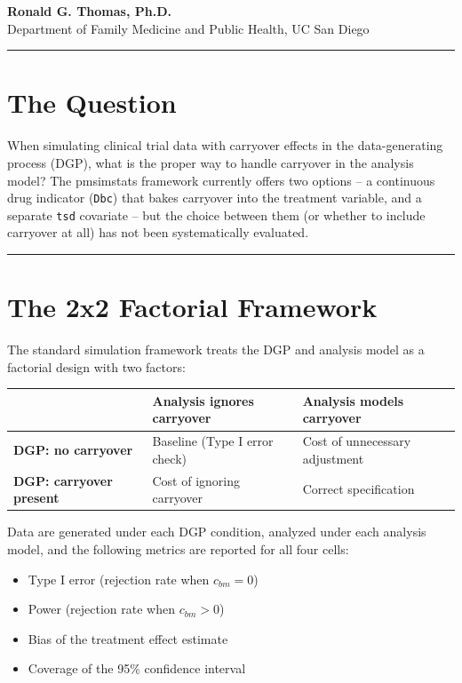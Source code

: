 \documentclass[11pt]{article}
\begin{document}
\maketitle
\thispagestyle{fancy}
\tableofcontents

\textbf{Ronald G. Thomas, Ph.D.}\\
Department of Family Medicine and Public Health, UC San Diego

\bigskip\noindent\rule{\textwidth}{0.4pt}\bigskip

\section{The Question}

When simulating clinical trial data with carryover effects in the
data-generating process (DGP), what is the proper way to handle
carryover in the analysis model? The pmsimstats framework currently
offers two options -- a continuous drug indicator (\texttt{Dbc}) that
bakes carryover into the treatment variable, and a separate \texttt{tsd}
covariate -- but the choice between them (or whether to include
carryover at all) has not been systematically evaluated.

\bigskip\noindent\rule{\textwidth}{0.4pt}\bigskip

\section{The 2x2 Factorial Framework}

The standard simulation framework treats the DGP and analysis
model as a factorial design with two factors:

\begin{table}[h]
\centering
\begin{tabular}{lll}
\toprule
 & Analysis ignores carryover & Analysis models carryover \\
\midrule
\textbf{DGP: no carryover} & Baseline (Type I error check) & Cost of unnecessary adjustment \\
\textbf{DGP: carryover present} & Cost of ignoring carryover & Correct specification \\
\bottomrule
\end{tabular}
\end{table}

Data are generated under each DGP condition, analyzed under each
analysis model, and the following metrics are reported for all
four cells:

\begin{itemize}
  \item Type I error (rejection rate when $c_{bm} = 0$)
  \item Power (rejection rate when $c_{bm} > 0$)
  \item Bias of the treatment effect estimate
  \item Coverage of the 95\% confidence interval
\end{itemize}
\end{document}
